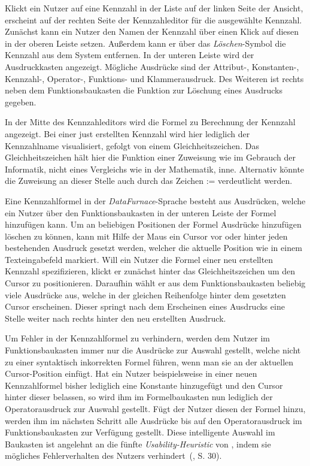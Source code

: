 \documentclass[
  language=german, %
  type=bachelor,%
  ngerman
]{isthesis}
\begin{document}
\begin{content}
  Klickt ein Nutzer auf eine Kennzahl in der Liste auf der linken Seite der
  Ansicht, erscheint auf der rechten Seite der Kennzahleditor für die
  ausgewählte Kennzahl. Zunächst kann ein Nutzer den Namen der Kennzahl über
  einen Klick auf diesen in der oberen Leiste setzen. Außerdem kann er über das
  \textit{Löschen}-Symbol die Kennzahl aus dem System entfernen. In der unteren
  Leiste wird der Ausdruckkasten angezeigt. Mögliche Ausdrücke sind der
  \mbox{Attribut-,} \mbox{Konstanten-,} \mbox{Kennzahl-,} \mbox{Operator-,}
  Funktions- und Klammerausdruck.  Des Weiteren ist rechts neben dem
  Funktionsbaukasten die Funktion zur Löschung eines Ausdrucks gegeben.

  In der Mitte des Kennzahleditors wird die Formel zu Berechnung der Kennzahl
  angezeigt. Bei einer just erstellten Kennzahl wird hier lediglich der
  Kennzahlname visualisiert, gefolgt von einem Gleichheitszeichen. Das
  Gleichheitszeichen hält hier die Funktion einer Zuweisung wie im Gebrauch
  der Informatik, nicht eines Vergleichs wie in der Mathematik, inne.
  Alternativ könnte die Zuweisung an dieser Stelle auch durch das Zeichen
  \mbox{:=} verdeutlicht werden. 
  
  Eine Kennzahlformel in der \textit{DataFurnace}-Sprache besteht aus
  Ausdrücken, welche ein Nutzer über den Funktionsbaukasten in der unteren
  Leiste der Formel hinzufügen kann. Um an beliebigen Positionen der Formel
  Ausdrücke hinzufügen \bzw{} löschen zu können, kann mit Hilfe der Maus ein
  Cursor vor oder hinter jeden bestehenden Ausdruck gesetzt werden, welcher die
  aktuelle Position wie in einem Texteingabefeld markiert. Will ein Nutzer die
  Formel einer neu erstellten Kennzahl spezifizieren, klickt er zunächst hinter
  das Gleichheitszeichen um den Cursor zu positionieren.  Daraufhin wählt er
  aus dem Funktionsbaukasten beliebig viele Ausdrücke aus, welche in der
  gleichen Reihenfolge hinter dem gesetzten Cursor erscheinen.  Dieser springt
  nach dem Erscheinen eines Ausdrucks eine Stelle weiter nach rechts hinter den
  neu erstellten Ausdruck. 

  Um Fehler in der Kennzahlformel zu verhindern, werden dem Nutzer im
  Funktionsbaukasten immer nur die Ausdrücke zur Auswahl gestellt, welche nicht
  zu einer syntaktisch inkorrekten Formel führen, wenn man sie an der aktuellen
  Cursor-Position einfügt. Hat ein Nutzer beispielsweise in einer neuen
  Kennzahlformel bisher lediglich eine Konstante hinzugefügt und den Cursor
  hinter dieser belassen, so wird ihm im Formelbaukasten nun lediglich der
  Operatorausdruck zur Auswahl gestellt. Fügt der Nutzer diesen der Formel
  hinzu, werden ihm im nächsten Schritt alle Ausdrücke bis auf den
  Operatorausdruck im Funktionsbaukasten zur Verfügung gestellt. Diese
  intelligente Auswahl im Baukasten ist angelehnt an die fünfte
  \textit{Usability-Heuristic} von \textsc{\citeauthor{nielsen1994heuristic}},
  indem sie mögliches Fehlerverhalten des Nutzers
  verhindert~(\citeyear{nielsen1994heuristic}, S. 30).


\end{content}
\end{document}
